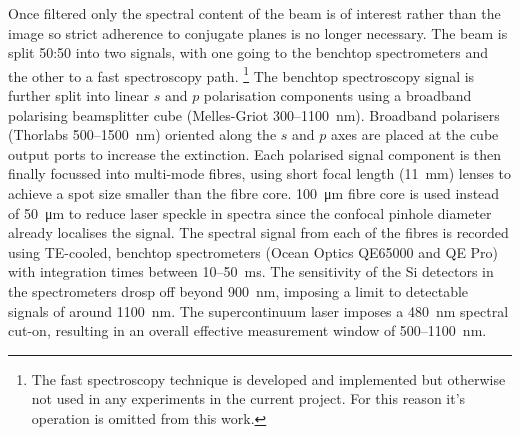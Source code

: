 \documentclass{article}
\begin{document}

Once filtered only the spectral content of the beam is of interest rather than the image so strict adherence to conjugate planes is no longer necessary. The beam is split 50:50 into two signals, with one going to the benchtop spectrometers and the other to a fast spectroscopy path.%
\footnote{The fast spectroscopy technique is developed and implemented but otherwise not used in any experiments in the current project. For this reason it's operation is omitted from this work.}
The benchtop spectroscopy signal is further split into linear $s$ and $p$ polarisation components using a broadband polarising beamsplitter cube (Melles-Griot 300--\SI{1100}{nm}). Broadband polarisers (Thorlabs 500--\SI{1500}{nm}) oriented along the $s$ and $p$ axes are placed at the cube output ports to increase the extinction. Each polarised signal component is then finally focussed into multi-mode fibres, using short focal length (\SI{11}{mm}) lenses to achieve a spot size smaller than the fibre core. \SI{100}{\micro\metre} fibre core is used instead of \SI{50}{\micro\metre} to reduce laser speckle in spectra since the confocal pinhole diameter already localises the signal.
The spectral signal from each of the fibres is recorded using TE-cooled, benchtop spectrometers (Ocean Optics QE65000 and QE Pro) with integration times between 10--\SI{50}{ms}. The sensitivity of the Si detectors in the spectrometers drosp off beyond \SI{900}{nm}, imposing a limit to detectable signals of around \SI{1100}{nm}. The supercontinuum laser imposes a \SI{480}{nm} spectral cut-on, resulting in an overall effective measurement window of 500--\SI{1100}{nm}.
\end{document}

